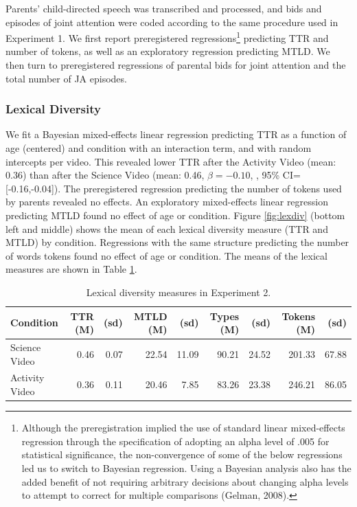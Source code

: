 \documentclass[man,floatsintext]{apa6}
\let\rmarkdownfootnote\footnote%
\def\footnote{\protect\rmarkdownfootnote}
\begin{document}
Parents' child-directed speech was transcribed and processed, and bids and episodes of joint attention were coded according to the same procedure used in Experiment 1.
We first report preregistered regressions\footnote{Although the preregistration implied the use of standard linear mixed-effects regression through the specification of adopting an alpha level of .005 for statistical significance, the non-convergence of some of the below regressions led us to switch to Bayesian regression. Using a Bayesian analysis also has the added benefit of not requiring arbitrary decisions about changing alpha levels to attempt to correct for multiple comparisons (Gelman, 2008).} predicting TTR and number of tokens, as well as an exploratory regression predicting MTLD.
We then turn to preregistered regressions of parental bids for joint attention and the total number of JA episodes.

\hypertarget{lexical-diversity-1}{%
\subsubsection{Lexical Diversity}\label{lexical-diversity-1}}

We fit a Bayesian mixed-effects linear regression predicting TTR as a function of age (centered) and condition with an interaction term, and with random intercepts per video.
This revealed lower TTR after the Activity Video (mean: 0.36) than after the Science Video (mean: 0.46, \(\beta=-0.10\), , 95\% CI={[}-0.16,-0.04{]}).
The preregistered regression predicting the number of tokens used by parents revealed no effects.
An exploratory mixed-effects linear regression predicting MTLD found no effect of age or condition.
Figure \ref{fig:lexdiv} (bottom left and middle) shows the mean of each lexical diversity measure (TTR and MTLD) by condition.
Regressions with the same structure predicting the number of words tokens found no effect of age or condition.
The means of the lexical measures are shown in Table \ref{e2tab}.

\begin{table}

\caption{\label{tab:e2tab}\label{e2tab} Lexical diversity measures in Experiment 2.}
\centering
\begin{tabular}[t]{l|r|r|r|r|r|r|r|r}
\hline
Condition & TTR (M) & (sd) & MTLD (M) & (sd) & Types (M) & (sd) & Tokens (M) & (sd)\\
\hline
Science Video & 0.46 & 0.07 & 22.54 & 11.09 & 90.21 & 24.52 & 201.33 & 67.88\\
\hline
Activity Video & 0.36 & 0.11 & 20.46 & 7.85 & 83.26 & 23.38 & 246.21 & 86.05\\
\hline
\end{tabular}
\end{table}
\end{document}
